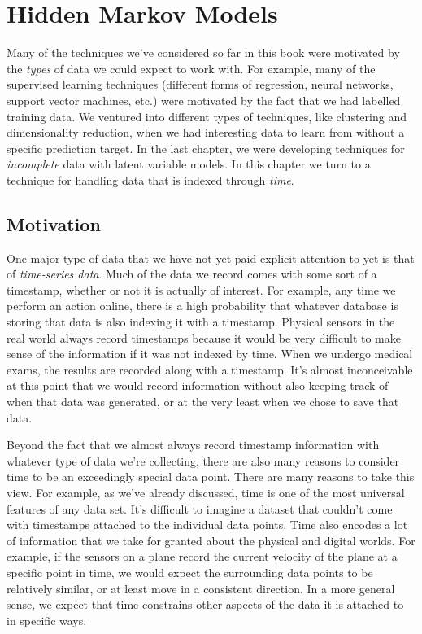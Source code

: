 \chapter{Hidden Markov Models}
Many of the techniques we've considered so far in this book were motivated by the \textit{types} of data we could expect to work with. For example, many of the supervised learning techniques (different forms of regression, neural networks, support vector machines, etc.) were motivated by the fact that we had labelled training data. We ventured into different types of techniques, like clustering and dimensionality reduction, when we had interesting data to learn from without a specific prediction target. In the last chapter, we were developing techniques for \textit{incomplete} data with latent variable models. In this chapter we turn to a technique for handling data that is indexed through \textit{time}.

\section{Motivation}
One major type of data that we have not yet paid explicit attention to yet is that of \textit{time-series data}. Much of the data we record comes with some sort of a timestamp, whether or not it is actually of interest. For example, any time we perform an action online, there is a high probability that whatever database is storing that data is also indexing it with a timestamp. Physical sensors in the real world always record timestamps because it would be very difficult to make sense of the information if it was not indexed by time. When we undergo medical exams, the results are recorded along with a timestamp. It's almost inconceivable at this point that we would record information without also keeping track of when that data was generated, or at the very least when we chose to save that data.

Beyond the fact that we almost always record timestamp information with whatever type of data we're collecting, there are also many reasons to consider time to be an exceedingly special data point. There are many reasons to take this view. For example, as we've already discussed, time is one of the most universal features of any data set. It's difficult to imagine a dataset that couldn't come with timestamps attached to the individual data points. Time also encodes a lot of information that we take for granted about the physical and digital worlds. For example, if the sensors on a plane record the current velocity of the plane at a specific point in time, we would expect the surrounding data points to be relatively similar, or at least move in a consistent direction. In a more general sense, we expect that time constrains other aspects of the data it is attached to in specific ways.

